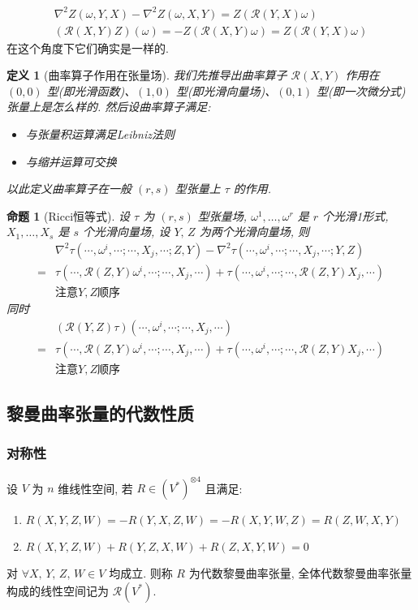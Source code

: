 \documentclass{book}
\newtheorem{definition}[theorem]{\indent 定义}
\newtheorem{proposition}[theorem]{\indent 命题}
\begin{document}
    \begin{gather*}
        \nabla^2Z(\omega,Y,X) - \nabla^2Z(\omega,X,Y) = Z(\mathcal{R}(Y,X)\omega) \\
        (\mathcal{R}(X,Y)Z)(\omega) = -Z(\mathcal{R}(X,Y)\omega) = Z(\mathcal{R}(Y,X)\omega)
    \end{gather*}
    在这个角度下它们确实是一样的.
    \begin{definition}[曲率算子作用在张量场]
        我们先推导出曲率算子 $\mathcal{R}(X,Y)$ 作用在 $(0,0)$ 型(即光滑函数)、$(1,0)$ 型(即光滑向量场)、$(0,1)$ 型(即一次微分式)张量上是怎么样的. 然后设曲率算子满足:
        \begin{itemize}
            \item 与张量积运算满足Leibniz法则
            \item 与缩并运算可交换
        \end{itemize}
        以此定义曲率算子在一般 $(r,s)$ 型张量上 $\tau$ 的作用.
    \end{definition}
    \begin{proposition}[Ricci恒等式]
        设 $\tau$ 为 $(r,s)$ 型张量场, $\omega^1,\dots,\omega^r$ 是 $r$ 个光滑1形式, $X_1,\dots,X_s$ 是 $s$ 个光滑向量场, 设 $Y,\,Z$ 为两个光滑向量场, 则
        \begin{align*}
            & \nabla^2\tau(\cdots,\omega^i,\cdots;\cdots,X_j,\cdots;Z,Y) - \nabla^2\tau(\cdots,\omega^i,\cdots;\cdots,X_j,\cdots;Y,Z) \\
            =& \tau(\cdots,\mathcal{R}(Z,Y)\omega^i,\cdots;\cdots,X_j,\cdots) + \tau(\cdots,\omega^i,\cdots;\cdots,\mathcal{R}(Z,Y)X_j,\cdots) \\
            & \text{注意}Y,Z\text{顺序}
        \end{align*}
        同时
        \begin{align*}
            &(\mathcal{R}(Y,Z)\tau)(\cdots,\omega^i,\cdots;\cdots,X_j,\cdots) \\
            =& \tau(\cdots,\mathcal{R}(Z,Y)\omega^i,\cdots;\cdots,X_j,\cdots) + \tau(\cdots,\omega^i,\cdots;\cdots,\mathcal{R}(Z,Y)X_j,\cdots) \\
            & \text{注意}Y,Z\text{顺序}
        \end{align*}
    \end{proposition}

    \subsection{黎曼曲率张量的代数性质}
    \subsubsection{对称性}
        设 $V$ 为 $n$ 维线性空间, 若 $R\in(V^*)^{\otimes4}$ 且满足:
        \begin{enumerate}
            \item $R(X,Y,Z,W) = -R(Y,X,Z,W) = -R(X,Y,W,Z) = R(Z,W,X,Y)$
            \item $R(X,Y,Z,W) + R(Y,Z,X,W) + R(Z,X,Y,W) = 0$
        \end{enumerate} 对 $\forall X,\,Y,\,Z,\,W\in V$ 均成立.
        则称 $R$ 为代数黎曼曲率张量, 全体代数黎曼曲率张量构成的线性空间记为 $\mathcal{R}(V^*)$.
\end{document}
